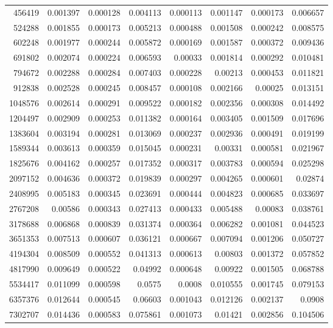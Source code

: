 \begin{longtable}{r r r r r r r r}
456419 & 0.001397 & 0.000128 & 0.004113 & 0.000113 & 0.001147 & 0.000173 & 0.006657 \\
524288 & 0.001855 & 0.000173 & 0.005213 & 0.000488 & 0.001508 & 0.000242 & 0.008575 \\
602248 & 0.001977 & 0.000244 & 0.005872 & 0.000169 & 0.001587 & 0.000372 & 0.009436 \\
691802 & 0.002074 & 0.000224 & 0.006593 & 0.00033 & 0.001814 & 0.000292 & 0.010481 \\
794672 & 0.002288 & 0.000284 & 0.007403 & 0.000228 & 0.00213 & 0.000453 & 0.011821 \\
912838 & 0.002528 & 0.000245 & 0.008457 & 0.000108 & 0.002166 & 0.00025 & 0.013151 \\
1048576 & 0.002614 & 0.000291 & 0.009522 & 0.000182 & 0.002356 & 0.000308 & 0.014492 \\
1204497 & 0.002909 & 0.000253 & 0.011382 & 0.000164 & 0.003405 & 0.001509 & 0.017696 \\
1383604 & 0.003194 & 0.000281 & 0.013069 & 0.000237 & 0.002936 & 0.000491 & 0.019199 \\
1589344 & 0.003613 & 0.000359 & 0.015045 & 0.000231 & 0.00331 & 0.000581 & 0.021967 \\
1825676 & 0.004162 & 0.000257 & 0.017352 & 0.000317 & 0.003783 & 0.000594 & 0.025298 \\
2097152 & 0.004636 & 0.000372 & 0.019839 & 0.000297 & 0.004265 & 0.000601 & 0.02874 \\
2408995 & 0.005183 & 0.000345 & 0.023691 & 0.000444 & 0.004823 & 0.000685 & 0.033697 \\
2767208 & 0.00586 & 0.000343 & 0.027413 & 0.000433 & 0.005488 & 0.00083 & 0.038761 \\
3178688 & 0.006868 & 0.000839 & 0.031374 & 0.000364 & 0.006282 & 0.001081 & 0.044523 \\
3651353 & 0.007513 & 0.000607 & 0.036121 & 0.000667 & 0.007094 & 0.001206 & 0.050727 \\
4194304 & 0.008509 & 0.000552 & 0.041313 & 0.000613 & 0.00803 & 0.001372 & 0.057852 \\
4817990 & 0.009649 & 0.000522 & 0.04992 & 0.000648 & 0.00922 & 0.001505 & 0.068788 \\
5534417 & 0.011099 & 0.000598 & 0.0575 & 0.0008 & 0.010555 & 0.001745 & 0.079153 \\
6357376 & 0.012644 & 0.000545 & 0.06603 & 0.001043 & 0.012126 & 0.002137 & 0.0908 \\
7302707 & 0.014436 & 0.000583 & 0.075861 & 0.001073 & 0.01421 & 0.002856 & 0.104506 \\

\end{longtable}
